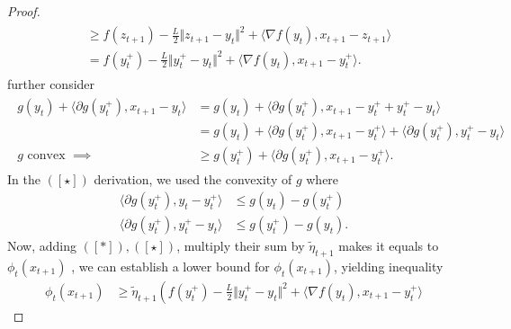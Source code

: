 \begin{proof}
\begin{align*}
\begin{aligned}
                &\ge 
                f(z_{t + 1}) - \frac{L}{2} \Vert z_{t + 1} - y_t\Vert^2 + 
                \langle \nabla f(y_t), x_{t +1} - z_{t + 1}\rangle
                \\
                &= 
                f(y_t^+) - \frac{L}{2}\Vert y_t^+ - y_t\Vert^2
                + \langle \nabla f(y_t), x_{t + 1} - y_t^+\rangle.     
            \end{aligned}
            \tag{$[*]$}
        \end{align*}
        further consider
        \begin{align*}
            \begin{aligned}
                g(y_t) + \langle \partial g(y_t^+), x_{t + 1} - y_t\rangle 
                &= g(y_t) + 
                \langle \partial g(y_t^+), 
                x_{t + 1} - y_t^+ + y_t^+ - y_t
                \rangle
                \\
                &= g(y_t) 
                + \langle \partial g (y_t^+),
                    x_{t + 1} - y_t^+
                \rangle
                + 
                \langle 
                    \partial g(y_t^+), y_t^+ - y_t
                \rangle
                \\
                g \text{ convex }\implies 
                &\ge 
                g(y_t^+) + 
                \langle \partial g(y_t^+), x_{t + 1} - y_t^+\rangle. 
            \end{aligned}
            \tag{$[\star]$}
        \end{align*}
        In the $([\star])$ derivation, we used the convexity of $g$ where 
        \begin{align*}
            \langle \partial g(y_t^+), y_t - y_t^+\rangle
            &\le g(y_t) - g(y_t^+)
            \\
            \langle \partial g (y_t^+), y_t^+ - y_t \rangle
            &\le 
            g(y_t^+) - g(y_t). 
        \end{align*}
        Now, adding $([*]), ([\star])$, multiply their sum by $\tilde\eta_{t + 1}$ makes it equals to $\phi_t(x_{t +1 })$ , we can establish a lower bound for $\phi_t(x_{t + 1})$, yielding inequality 
        {\small
            \begin{align*}
                \phi_t(x_{t + 1})
                &\ge 
                \tilde\eta_{t + 1}
                \left(
                    f(y_t^+) - \frac{L}{2}\Vert y_t^+ - y_t\Vert^2 
                    +
                    \langle \nabla f(y_t), x_{t + 1} - y_t^+\rangle

\end{align*}}
\end{proof}
